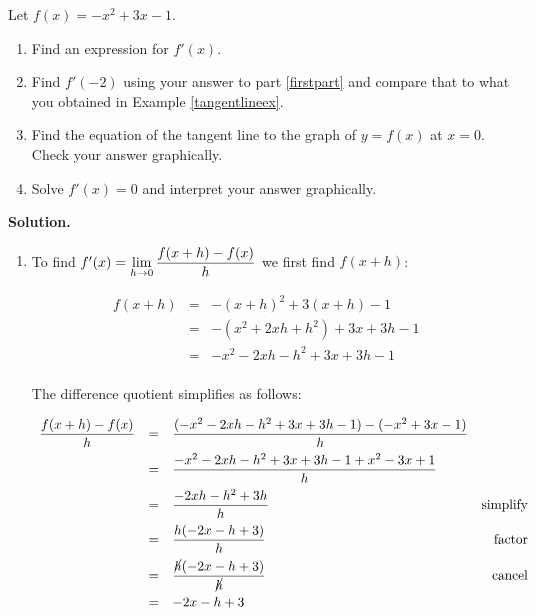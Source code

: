 \documentclass{ximera}
\begin{document}
\pagebreak


\begin{example}  \label{derivativeex}  Let $f(x) = -x^2 + 3x-1$.  

\begin{enumerate}

\item \label{firstpart} Find an expression for $f'(x)$.  

\item  Find $f'(-2)$ using your answer to part \ref{firstpart}   and compare that to what you obtained in Example \ref{tangentlineex}.

\item  Find the equation of the tangent line to the graph of $y = f(x)$ at $x = 0$.  Check your answer graphically.

\item  Solve $f'(x) = 0 $ and interpret your answer graphically.

\end{enumerate}

\bigskip

{\bf Solution.}

\begin{enumerate}

\item  To find  $f'(x) = \ds{ \lim_{h \rightarrow 0} \dfrac{f(x+h) - f(x)}{h}}$ we  first find $f(x+h)$:

\[ \begin{array}{rclr}  
  f(x+h) & = & -(x+h)^2 +3(x+h) -1 & \\ 
  & = & - (x^2 +2xh+h^2) +3x+3h-1 & \\
 & = & -x^2 -  2xh - h^2+3x+3h-1& \\
 \end{array} \]

The difference quotient simplifies as follows:

\[ \begin{array}{rclr}

\dfrac{f(x+h)-f(x)}{h} & = & \dfrac{( -x^2 - 2xh - h^2+3x+3h-1) -(-x^2+3x-1)}{h} & \\[8pt]
                                & = & \dfrac{-x^2 - 2xh - h^2+3x+3h-1 + x^2-3x+1}{h} & \\[8pt]
                                 & = & \dfrac{-2xh-h^2+3h}{h} & \text{simplify}\\[8pt]
                                & = &  \dfrac{h(-2x - h + 3)}{h} & \text{factor} \\[8pt]
                                & = &  \dfrac{\cancel{h}(-2x-h+3)}{\cancel{h}} &  \text{cancel} \\[8pt]
                                & = & -2x-h+3\\ \end{array} \]


\end{enumerate}
\end{example}
\end{document}
